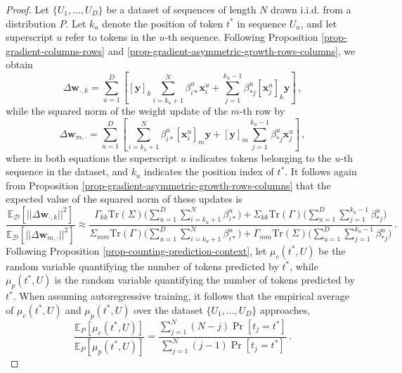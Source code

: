 \begin{proof}
%
Let $\{U_1, \dots, U_D\}$ be a dataset of sequences of length $N$ drawn i.i.d. from a distribution $P$.
%
Let \( k_u \) denote the position of token \( t^* \) in sequence \( U_u \), and let superscript \( u \) refer to tokens in the \( u \)-th sequence.
%
Following Proposition \ref{prop-gradient-columns-rows} and \ref{prop-gradient-asymmetric-growth-rows-columns}, we obtain 
%
\begin{equation}
\Delta \bm{w}_{\cdot, k}  =  \sum_{u=1}^D \left[[\bm{y}]_k \sum_{i=k_u+1}^N \beta^u_{i*}\bm{x}^u_i + \sum_{j=1}^{k_u-1} \beta^u_{*j}[\bm{x}^u_j]_k\bm{y}
\right] \,,
\end{equation}
%
while the squared norm of the weight update of the $m$-th row by
%
\begin{equation}
\Delta \bm{w}_{m, \cdot}  =  \sum_{u=1}^D \left[ \sum_{i=k_u+1}^N \beta^u_{i*}[\bm{x}^u_i]_m\bm{y} + [\bm{y}]_m\sum_{j=1}^{k_u-1} \beta^u_{*j}\bm{x}^u_j
\right]\,,
\end{equation}
%
where in both equations the superscript $u$ indicates tokens belonging to the $u$-th sequence in the dataset, and $k_u$ indicates the position index of $t^*$.
%
It follows again from Proposition \ref{prop-gradient-asymmetric-growth-rows-columns} that the expected value of the squared norm of these updates is
%
\begin{equation}
\label{suppeq:ratio-squared-norm-theorem-directionality}
\frac{\mathbb{E}_{\mathcal{D}}\left[ ||\Delta \bm{w}_{\cdot, k}||^2 \right]}{\mathbb{E}_{\mathcal{D}}\left[ ||\Delta \bm{w}_{m, \cdot}||^2 \right]} \approx \frac{\Gamma_{kk}\text{Tr}(\Sigma)\big(\sum_{u=1}^D\sum_{i=k_u+1}^N \beta^u_{i*}\big) + \Sigma_{kk}\text{Tr}(\Gamma)\big(\sum_{u=1}^D\sum_{j=1}^{k_u-1} \beta^u_{*j}\big)}{\Sigma_{mm}\text{Tr}(\Gamma)\big(\sum_{u=1}^D\sum_{i=k_u+1}^N \beta^u_{i*}\big) + \Gamma_{mm}\text{Tr}(\Sigma)\big(\sum_{u=1}^D\sum_{j=1}^{k_u-1} \beta^u_{*j}\big)} \,.
\end{equation}
%
Following Proposition \ref{prop-counting-prediction-context}, let $\mu_c(t^*, U)$ be the random variable quantifying the number of tokens predicted by $t^*$, while $\mu_p(t^*, U)$ is the random variable quantifying the number of tokens predicted by $t^*$.
%
When assuming autoregressive training, it follows that the empirical average of $\mu_c(t^*, U)$ and $\mu_p(t^*, U)$ over the dataset $\{U_1, \dots, U_D\}$ approaches,
%
\begin{equation}
    \frac{\mathbb{E}_P[\mu_c(t^*, U)]}{\mathbb{E}_P[\mu_p(t^*, U)]} = \frac{\sum_{j=1}^N (N-j)\Pr[t_j = t^*]}{\sum_{j=1}^N(j-1)\Pr[t_j = t^*]} \,.

\end{equation}
\end{proof}

